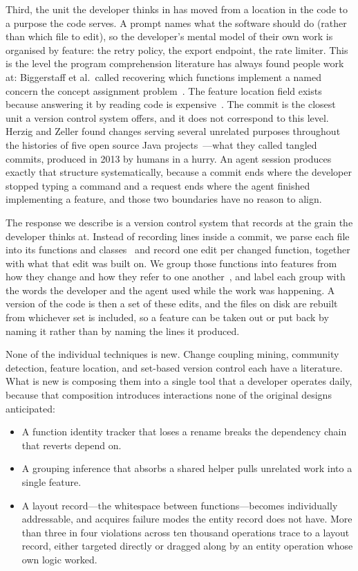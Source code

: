 Third, the unit the developer thinks in has moved from a location in the code to
a purpose the code serves. A prompt names what the software should do (rather
than which file to edit), so the developer's mental model of their own work is
organised by feature: the retry policy, the export endpoint, the rate limiter. This is the
level the program comprehension literature has always found people work at:
Biggerstaff et al.\ called recovering which functions implement a named concern
the concept assignment problem~\cite{biggerstaff1993}. The feature location
field exists because answering it by reading code is
expensive~\cite{dit2013}. The commit is the closest unit a version control system
offers, and it does not correspond to this level. Herzig and Zeller found
changes serving several unrelated purposes throughout the histories of five open
source Java projects~\cite{herzig2013}---what they called tangled commits,
produced in 2013 by humans in a hurry. An agent session produces exactly that
structure systematically, because a commit ends where the developer stopped
typing a command and a request ends where the agent finished implementing a
feature, and those two boundaries have no reason to align.

The response we describe is a version control system that records at the grain
the developer thinks at. Instead of recording lines inside a commit, we parse
each file into its functions and classes~\cite{treesitter} and record one edit
per changed function, together with what that edit was built on. We group those
functions into features from how they change and how they refer to one
another~\cite{zimmermann2004,ying2004,traag2019}, and label each group with the
words the developer and the agent used while the work was happening. A version
of the code is then a set of these edits, and the files on disk are rebuilt
from whichever set is included, so a feature can be taken out or put back by
naming it rather than by naming the lines it produced.

None of the individual techniques is new. Change coupling mining, community
detection, feature location, and set-based version control each have a
literature. What is new is composing them into a single tool that a developer
operates daily, because that composition introduces interactions none of the
original designs anticipated:

\begin{itemize}
\item A function identity tracker that loses a rename breaks the dependency
  chain that reverts depend on.
\item A grouping inference that absorbs a shared helper pulls unrelated work
  into a single feature.
\item A layout record---the whitespace between functions---becomes individually
  addressable, and acquires failure modes the entity record does not have. More
  than three in four violations across ten thousand operations trace to a layout
  record, either targeted directly or dragged along by an entity operation whose
  own logic worked.
\end{itemize}

